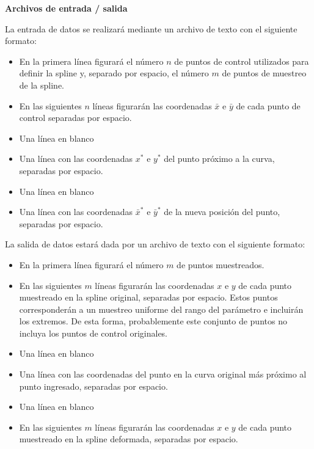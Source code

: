 {\bf Archivos de entrada / salida}

La entrada de datos se realizar\'a mediante un archivo de texto con el siguiente formato:
\vspace{-15pt}
\begin{itemize}
  \setlength{\itemsep}{0pt}
  \setlength{\parskip}{0pt}
  \setlength{\parsep}{0pt}
\item En la primera l\'inea figurar\'a el n\'umero $n$ de puntos de control utilizados para definir la spline y, separado por espacio, el n\'umero $m$ de puntos de muestreo de la spline. 
\item En las siguientes $n$ l\'ineas figurar\'an las coordenadas $\bar{x}$ e $\bar{y}$ de cada punto de control separadas por espacio.
\item Una l\'inea en blanco
\item Una l\'inea con las coordenadas $x^*$ e $y^*$ del punto pr\'oximo a la curva, separadas por espacio.
\item Una l\'inea en blanco
\item Una l\'inea con las coordenadas $\bar{x}^*$ e $\bar{y}^*$ de la nueva posici\'on del punto, separadas por espacio.
\end{itemize}

La salida de datos estar\'a dada por un archivo de texto con el siguiente formato:
\vspace{-15pt}
\begin{itemize}
  \setlength{\itemsep}{0pt}
  \setlength{\parskip}{0pt}
  \setlength{\parsep}{0pt}
\item En la primera l\'inea figurar\'a el n\'umero $m$ de puntos muestreados. 
\item En las siguientes $m$ l\'ineas figurar\'an las coordenadas $x$ e $y$ de cada punto muestreado en la spline original, separadas por espacio. Estos puntos corresponder\'an a un muestreo uniforme del rango del par\'ametro e incluir\'an los extremos. De esta forma, probablemente este conjunto de puntos no incluya los puntos de control originales.
\item Una l\'inea en blanco
\item Una l\'inea con las coordenadas del punto en la curva original m\'as pr\'oximo al punto ingresado, separadas por espacio.
\item Una l\'inea en blanco
\item En las siguientes $m$ l\'ineas figurar\'an las coordenadas $x$ e $y$ de cada punto muestreado en la spline deformada, separadas por espacio.
\end{itemize}


